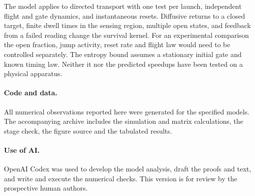 \documentclass[11pt]{article}
\begin{document}
The model applies to directed transport with one test per launch, independent flight and gate dynamics, and instantaneous resets. Diffusive returns to a closed target, finite dwell times in the sensing region, multiple open states, and feedback from a failed reading change the survival kernel. For an experimental comparison the open fraction, jump activity, reset rate and flight law would need to be controlled separately. The entropy bound assumes a stationary initial gate and known timing law. Neither it nor the predicted speedups have been tested on a physical apparatus.

\paragraph{Code and data.} All numerical observations reported here were generated for the specified models. The accompanying archive includes the simulation and matrix calculations, the stage check, the figure source and the tabulated results.
\paragraph{Use of AI.} OpenAI Codex was used to develop the model analysis, draft the proofs and text, and write and execute the numerical checks. This version is for review by the prospective human authors.
\end{document}
